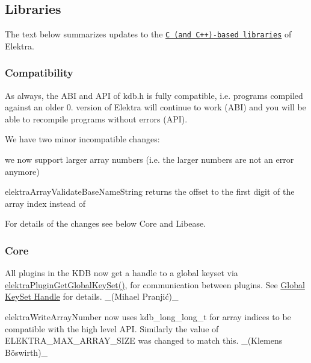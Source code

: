 \subsection*{Libraries}

The text below summarizes updates to the \href{https://www.libelektra.org/libraries/readme}{\tt C (and C++)-\/based libraries} of Elektra.

\subsubsection*{Compatibility}

As always, the A\+BI and A\+PI of kdb.\+h is fully compatible, i.\+e. programs compiled against an older 0. version of Elektra will continue to work (A\+BI) and you will be able to recompile programs without errors (A\+PI).

We have two minor incompatible changes\+:


\begin{DoxyItemize}
\item we now support larger array numbers (i.\+e. the larger numbers are not an error anymore)
\item {\ttfamily elektra\+Array\+Validate\+Base\+Name\+String} returns the offset to the first digit of the array index instead of {}
\end{DoxyItemize}

For details of the changes see below {\ttfamily Core} and {\ttfamily Libease}.

\subsubsection*{Core}


\begin{DoxyItemize}
\item All plugins in the K\+DB now get a handle to a global keyset via {\ttfamily \hyperlink{group__plugin_ga436cda13ed70c0face08661a90620bf6}{elektra\+Plugin\+Get\+Global\+Key\+Set()}}, for communication between plugins. See \hyperlink{doc_decisions_global_keyset_md}{Global Key\+Set Handle} for details. \+\_\+(Mihael Pranjić)\+\_\+
\item {\ttfamily elektra\+Write\+Array\+Number} now uses {\ttfamily kdb\+\_\+long\+\_\+long\+\_\+t} for array indices to be compatible with the high level A\+PI. Similarly the value of {\ttfamily E\+L\+E\+K\+T\+R\+A\+\_\+\+M\+A\+X\+\_\+\+A\+R\+R\+A\+Y\+\_\+\+S\+I\+ZE} was changed to match this. \+\_\+(Klemens Böswirth)\+\_\+
\end{DoxyItemize}

